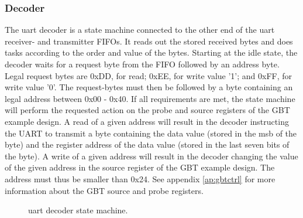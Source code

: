 \documentclass[main.tex]{subfiles}
\begin{document}
\subsubsection{Decoder}
The \gls{uart} decoder is a state machine connected to the other end of the \gls{uart} receiver- and transmitter FIFOs. It reads out the stored received bytes and does tasks according to the order and value of the bytes. Starting at the idle state, the decoder waits for a request byte from the FIFO followed by an address byte. Legal request bytes are 0xDD, for read; 0xEE, for write value '1'; and 0xFF, for write value '0'. The request-bytes must then be followed by a byte containing an legal address between 0x00 - 0x40. If all requirements are met, the state machine will perform the requested action on the probe and source registers of the GBT example design. A read of a given address will result in the decoder instructing the UART to transmit a byte containing the data value (stored in the \gls{msb} of the byte) and the register address of the data value (stored in the last seven bits of the byte). A write of a given address will result in the decoder changing the value of the given address in the source register of the GBT example design. The address must thus be smaller than 0x24. See appendix \ref{ap:gbtctrl} for more information about the GBT source and probe registers.

\begin{figure}[!b]
\begin{center}
\caption{\gls{uart} decoder state machine.}
\label{fig:uartdec}
\end{center}
\end{figure}  
\end{document}
